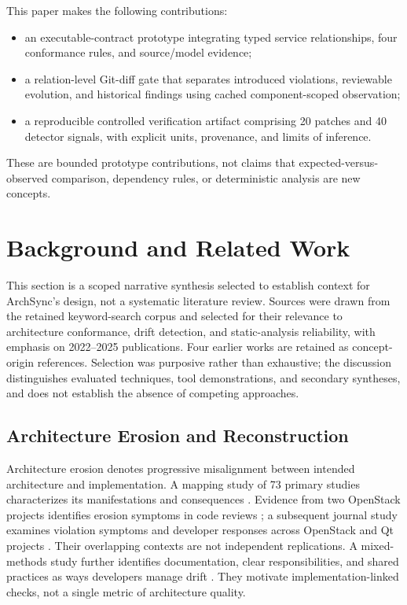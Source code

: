 \documentclass[conference]{IEEEtran}
\begin{document}
This paper makes the following contributions:
\begin{itemize}
  \item an executable-contract prototype integrating typed service relationships, four conformance rules, and source/model evidence;
  \item a relation-level Git-diff gate that separates introduced violations, reviewable evolution, and historical findings using cached component-scoped observation;
  \item a reproducible controlled verification artifact comprising 20 patches and 40 detector signals, with explicit units, provenance, and limits of inference.
\end{itemize}
These are bounded prototype contributions, not claims that expected-versus-observed comparison, dependency rules, or deterministic analysis are new concepts.

\section{Background and Related Work}

This section is a scoped narrative synthesis selected to establish context for ArchSync's design, not a systematic literature review. Sources were drawn from the retained keyword-search corpus and selected for their relevance to architecture conformance, drift detection, and static-analysis reliability, with emphasis on 2022--2025 publications. Four earlier works are retained as concept-origin references. Selection was purposive rather than exhaustive; the discussion distinguishes evaluated techniques, tool demonstrations, and secondary syntheses, and does not establish the absence of competing approaches.

\subsection{Architecture Erosion and Reconstruction}

Architecture erosion denotes progressive misalignment between intended architecture and implementation. A mapping study of 73 primary studies characterizes its manifestations and consequences \cite{li2022erosion}. Evidence from two OpenStack projects identifies erosion symptoms in code reviews \cite{li2022symptoms}; a subsequent journal study examines violation symptoms and developer responses across OpenStack and Qt projects \cite{li2023warnings}. Their overlapping contexts are not independent replications. A mixed-methods study further identifies documentation, clear responsibilities, and shared practices as ways developers manage drift \cite{anthony2024drifting}. They motivate implementation-linked checks, not a single metric of architecture quality.
\end{document}
